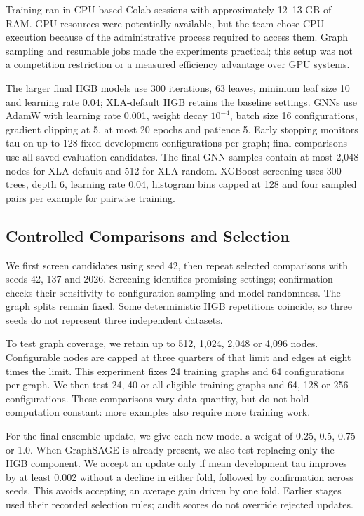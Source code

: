 \documentclass[letterpaper]{article}
\begin{document}
Training ran in CPU-based Colab sessions with approximately 12--13 GB of RAM. GPU resources were potentially available, but the team chose CPU execution because of the administrative process required to access them. Graph sampling and resumable jobs made the experiments practical; this setup was not a competition restriction or a measured efficiency advantage over GPU systems.

The larger final HGB models use 300 iterations, 63 leaves, minimum leaf size 10 and learning rate 0.04; XLA-default HGB retains the baseline settings. GNNs use AdamW with learning rate 0.001, weight decay $10^{-4}$, batch size 16 configurations, gradient clipping at 5, at most 20 epochs and patience 5. Early stopping monitors tau on up to 128 fixed development configurations per graph; final comparisons use all saved evaluation candidates. The final GNN samples contain at most 2,048 nodes for XLA default and 512 for XLA random. XGBoost screening uses 300 trees, depth 6, learning rate 0.04, histogram bins capped at 128 and four sampled pairs per example for pairwise training.

\subsection{Controlled Comparisons and Selection}
We first screen candidates using seed 42, then repeat selected comparisons with seeds 42, 137 and 2026. Screening identifies promising settings; confirmation checks their sensitivity to configuration sampling and model randomness. The graph splits remain fixed. Some deterministic HGB repetitions coincide, so three seeds do not represent three independent datasets.

To test graph coverage, we retain up to 512, 1,024, 2,048 or 4,096 nodes. Configurable nodes are capped at three quarters of that limit and edges at eight times the limit. This experiment fixes 24 training graphs and 64 configurations per graph. We then test 24, 40 or all eligible training graphs and 64, 128 or 256 configurations. These comparisons vary data quantity, but do not hold computation constant: more examples also require more training work.

For the final ensemble update, we give each new model a weight of 0.25, 0.5, 0.75 or 1.0. When GraphSAGE is already present, we also test replacing only the HGB component. We accept an update only if mean development tau improves by at least 0.002 without a decline in either fold, followed by confirmation across seeds. This avoids accepting an average gain driven by one fold. Earlier stages used their recorded selection rules; audit scores do not override rejected updates.
\end{document}
